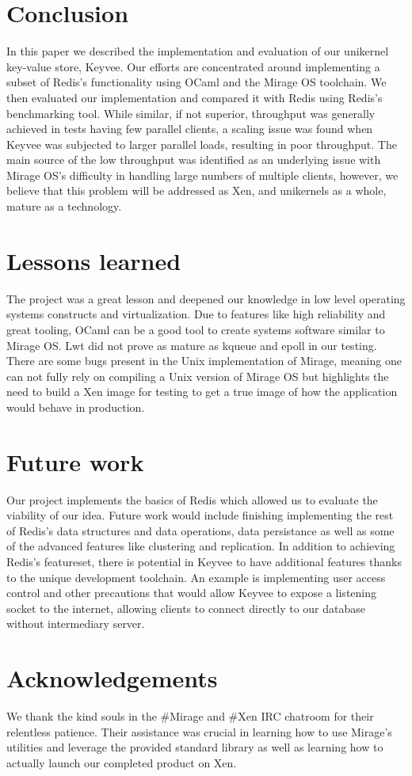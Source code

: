 \documentclass[english,10pt,twocolumn]{article}
\begin{document}
\section{Conclusion}
In this paper we described the implementation and evaluation of our unikernel key-value store, Keyvee.
Our efforts are concentrated around implementing a subset of Redis's functionality using OCaml and the Mirage OS toolchain.
We then evaluated our implementation and compared it with Redis using Redis's benchmarking tool.
While similar, if not superior, throughput was generally achieved in tests having few parallel clients, a scaling issue was found when Keyvee was subjected to larger parallel loads, resulting in poor throughput.
The main source of the low throughput was identified as an underlying issue with Mirage OS's difficulty in handling large numbers of multiple clients, however, we believe that this problem will be addressed as Xen, and unikernels as a whole, mature as a technology.

\section{Lessons learned}
The project was a great lesson and deepened our knowledge in low level operating systems constructs and virtualization.
Due to features like high reliability and great tooling, OCaml can be a good tool to create systems software similar to Mirage OS.
Lwt did not prove as mature as kqueue and epoll in our testing.
There are some bugs present in the Unix implementation of Mirage, meaning one can not fully rely on compiling a Unix version of Mirage OS but highlights the need to build a Xen image for testing to get a true image of how the application would behave in production.

\section{Future work}
Our project implements the basics of Redis which allowed us to evaluate the viability of our idea.
Future work would include finishing implementing the rest of Redis's data structures and data operations, data persistance as well as some of the advanced features like clustering and replication.
In addition to achieving Redis's featureset, there is potential in Keyvee to have additional features thanks to the unique development toolchain.
An example is implementing user access control and other precautions that would allow Keyvee to expose a listening socket to the internet, allowing clients to connect directly to our database without intermediary server.

\section{Acknowledgements}


We thank the kind souls in the \#Mirage and \#Xen IRC chatroom for their relentless patience.
Their assistance was crucial in learning how to use Mirage's utilities and leverage the provided standard library as well as learning how to actually launch our completed product on Xen.





\end{document}

